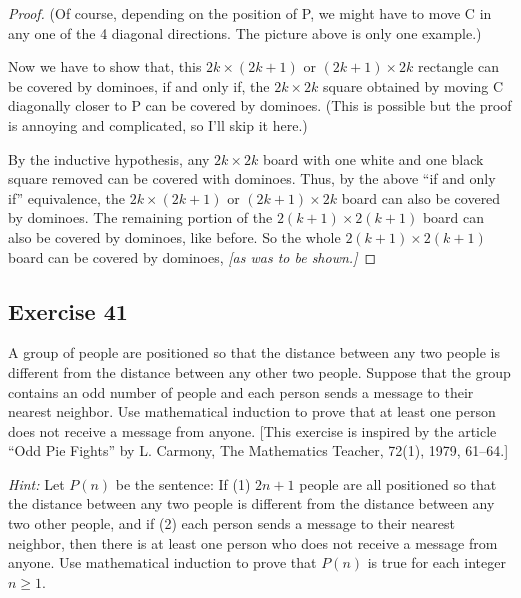\documentclass[14pt]{extarticle}
\begin{document}
\begin{proof}
(Of course, depending on the position of P, we might have to move C in any one of the 4 diagonal directions. The picture above is only one example.)

Now we have to show that, this $2k \times (2k+1)$ or $(2k+1) \times 2k$ rectangle can be covered by dominoes, if and only if, the $2k \times 2k$ square obtained by moving C diagonally closer to P can be covered by dominoes. (This is possible but the proof is annoying and complicated, so I'll skip it here.)

By the inductive hypothesis, any $2k \times 2k$ board with one white and one black square removed can be covered with dominoes. Thus, by the above ``if and only if'' equivalence, the $2k \times (2k+1)$ or $(2k+1) \times 2k$ board can also be covered by dominoes. The remaining portion of the $2(k+1) \times 2(k+1)$ board can also be covered by dominoes, like before. So the whole $2(k+1) \times 2(k+1)$ board can be covered by dominoes, {\it [as was to be shown.]}
\end{proof}

\subsection{Exercise 41}
A group of people are positioned so that the distance between any two people is different from the distance between any other two people. Suppose that the group contains an odd number of people and each person sends a message to their nearest neighbor. Use mathematical induction to prove that at least one person does not receive a message from anyone. [This exercise is inspired by the article “Odd Pie Fights” by L. Carmony, The Mathematics Teacher, 72(1), 1979, 61–64.]

{\it Hint:} Let $P(n)$ be the sentence: If (1) $2n + 1$ people are all positioned so that the distance between any two people is different from the distance between any two other people, and if (2) each person sends a message to their nearest neighbor, then there is at least one person who does not receive a message from anyone. Use mathematical induction to prove that $P(n)$ is true for each integer $n \geq 1$.
\end{document}
